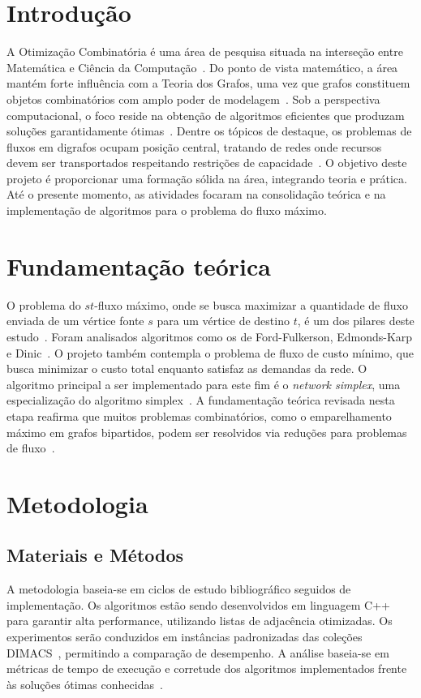 \documentclass[12pt,a4paper]{article}
\begin{document}
\section{Introdução}
A Otimização Combinatória é uma área de pesquisa situada na interseção entre Matemática e Ciência da Computação~\cite{korte2018combinatorial}. Do ponto de vista matemático, a área mantém forte influência com a Teoria dos Grafos, uma vez que grafos constituem objetos combinatórios com amplo poder de modelagem~\cite{bondy2008graph, diestel2017graph}. 
Sob a perspectiva computacional, o foco reside na obtenção de algoritmos eficientes que produzam soluções garantidamente ótimas~\cite{schrijver2003combinatorial, cook1998combinatorial}. Dentre os tópicos de destaque, os problemas de fluxos em digrafos ocupam posição central, tratando de redes onde recursos devem ser transportados respeitando restrições de capacidade~\cite{ahuja1993network}.
O objetivo deste projeto é proporcionar uma formação sólida na área, integrando teoria e prática. Até o presente momento, as atividades focaram na consolidação teórica e na implementação de algoritmos para o problema do fluxo máximo.

\section{Fundamentação teórica}
O problema do $st$-fluxo máximo, onde se busca maximizar a quantidade de fluxo enviada de um vértice fonte $s$ para um vértice de destino $t$, é um dos pilares deste estudo~\cite{ford1956maximal}. Foram analisados algoritmos como os de Ford-Fulkerson, Edmonds-Karp e Dinic~\cite{ford1956maximal, edmonds1972theoretical, dinic1970algorithm}. 
O projeto também contempla o problema de fluxo de custo mínimo, que busca minimizar o custo total enquanto satisfaz as demandas da rede. O algoritmo principal a ser implementado para este fim é o \textit{network simplex}, uma especialização do algoritmo simplex~\cite{dantzig1951application, ahuja1993network}. 
A fundamentação teórica revisada nesta etapa reafirma que muitos problemas combinatórios, como o emparelhamento máximo em grafos bipartidos, podem ser resolvidos via reduções para problemas de fluxo~\cite{ahuja1993network}.

\section{Metodologia}
\subsection{Materiais e Métodos}
A metodologia baseia-se em ciclos de estudo bibliográfico seguidos de implementação. Os algoritmos estão sendo desenvolvidos em linguagem C++ para garantir alta performance, utilizando listas de adjacência otimizadas. 
Os experimentos serão conduzidos em instâncias padronizadas das coleções DIMACS~\cite{Jensen2022}, permitindo a comparação de desempenho. A análise baseia-se em métricas de tempo de execução e corretude dos algoritmos implementados frente às soluções ótimas conhecidas~\cite{ford1956maximal}.
\end{document}
